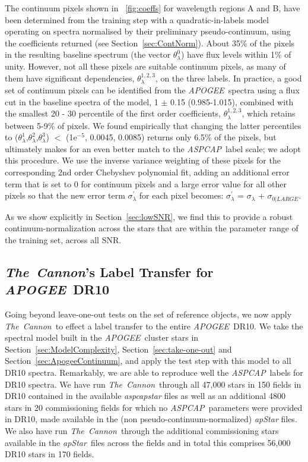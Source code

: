 \documentclass[12pt, preprint]{aastex}
\newcommand{\sectionname}{Section}
\newcommand{\tc}{\textsl{The~Cannon}}
\newcommand{\apogee}{\textsl{APOGEE}}
\newcommand{\aspcap}{\textsl{ASPCAP}}
\newcommand{\apstar}{\textsl{apStar}}
\begin{document}
The continuum pixels shown in \figurename~\ref{fig:coeffs} for wavelength regions A and B, 
have been determined from the training step with a quadratic-in-labels model operating on spectra normalised by their preliminary pseudo-continuum, using the coefficients returned (see \sectionname~\ref{sec:ContNorm}). About 35\% of the pixels in the resulting baseline spectrum  (the vector $\theta^0_\lambda$) have flux levels within 1\% of unity. However, not all these pixels are suitable continuum pixels, as many of them have significant dependencies,  $\theta^{1,2,3}_\lambda$,  on the three labels. In practice, a good set of continuum pixels can be identified from the \apogee\ spectra using a flux cut in the baseline spectra of the model, 1 $\pm$ 0.15 (0.985-1.015), combined with the smallest 20 - 30 percentile of the first order coefficients, $\theta^{1,2,3}_\lambda$,  which retains between 5-9\% of pixels. We found empirically that changing the latter percentiles to ($\theta^{1}_\lambda$,$\theta^{2}_\lambda$,$\theta^{3}_\lambda$) $<$ (1e$^{-5}$, 0.0045, 0.0085) returns only 6.5\% of the pixels, but ultimately makes for an even  better match to the \aspcap\ label scale; we adopt this procedure. We use the inverse variance weighting of these pixels for the corresponding 2nd order Chebyshev polynomial fit, adding an additional error term that is set to 0 for continuum pixels and a large error value for all other pixels so that the new error term $\sigma^{'}_\lambda$ for each pixel becomes:
$\sigma^{'}_\lambda$ = $\sigma_\lambda$ + $\sigma_{0|LARGE}$. 


As we show explicitly in \sectionname~\ref{sec:lowSNR}, we find this to provide a robust continuum-normalization across the stars that are within the parameter range of the training set, across all SNR. 

\subsection{\tc 's Label Transfer for \apogee\ DR10}
\label{sec:APOGEE_DR10_comparison}

Going beyond leave-one-out tests on the set of reference objects, we now apply \tc\ to effect a label transfer to the entire \apogee\ DR10.
We take the spectral model built in the \apogee\ cluster stars in \sectionname~\ref{sec:ModelComplexity}, \sectionname~\ref{sec:take-one-out} and \sectionname~\ref{sec:ApogeeContinuum},
and apply the test step with this model to all DR10 spectra.
Remarkably, we are able to reproduce well the \aspcap\ labels for DR10 spectra. We have run \tc\ through all 47,000 stars in 150 fields in DR10 contained in the available \textit{aspcapstar} files as well as an additional 4800 stars in 20 commissioning fields for which no \aspcap\ parameters were provided in DR10, 
made available in the (non pseudo-continuum-normalized) \textit{apStar} files. 
We also have run \tc\ through the additional commissioning stars available in the \apstar\ files across the fields and in total this
 comprises 56,000 DR10 stars in 170 fields. 
\end{document}
